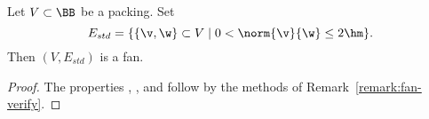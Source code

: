 \begin{lemma}\label{lemma:std-fan} 
Let $V\subset \BB$ be a packing.  Set 
\begin{displaymath}E_{std} = \{\{\v,\w\}\subset V\mid 0 <
\norm{\v}{\w} \le 2\hm\}.\end{displaymath} Then $(V,E_{std})$ is a fan.
\end{lemma}
%

\begin{proof}
The properties , , and  follow
by the methods of Remark~\ref{remark:fan-verify}.


\end{proof}
